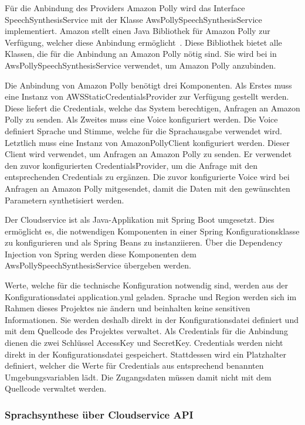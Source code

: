 Für die Anbindung des Providers Amazon Polly wird das Interface SpeechSynthesisService mit der Klasse AwsPollySpeechSynthesisService implementiert.
Amazon stellt einen Java Bibliothek für Amazon Polly zur Verfügung, welcher diese Anbindung ermöglicht~\cite{aws_polly_sdks}.
Diese Bibliothek bietet alle Klassen, die für die Anbindung an Amazon Polly nötig sind.
Sie wird bei in AwsPollySpeechSynthesisService verwendet, um Amazon Polly anzubinden.

Die Anbindung von Amazon Polly benötigt drei Komponenten.
Als Erstes muss eine Instanz von AWSStaticCredentialsProvider zur Verfügung gestellt werden.
Diese liefert die Credentials, welche das System berechtigen, Anfragen an Amazon Polly zu senden.
Als Zweites muss eine Voice konfiguriert werden.
Die Voice definiert Sprache und Stimme, welche für die Sprachausgabe verwendet wird.
Letztlich muss eine Instanz von AmazonPollyClient konfiguriert werden.
Dieser Client wird verwendet, um Anfragen an Amazon Polly zu senden.
Er verwendet den zuvor konfigurierten CredentialsProvider, um die Anfrage mit den entsprechenden Credentials zu ergänzen.
Die zuvor konfigurierte Voice wird bei Anfragen an Amazon Polly mitgesendet, damit die Daten mit den gewünschten Parametern synthetisiert werden.

Der Cloudservice ist als Java-Applikation mit Spring Boot umgesetzt.
Dies ermöglicht es, die notwendigen Komponenten in einer Spring Konfigurationsklasse zu konfigurieren und als Spring Beans zu instanziieren.
Über die Dependency Injection von Spring werden diese Komponenten dem AwsPollySpeechSynthesisService übergeben werden.

Werte, welche für die technische Konfiguration notwendig sind, werden aus der Konfigurationsdatei application.yml geladen.
Sprache und Region werden sich im Rahmen dieses Projektes nie ändern und beinhalten keine sensitiven Informationen.
Sie werden deshalb direkt in der Konfigurationsdatei definiert und mit dem Quellcode des Projektes verwaltet.
Als Credentials für die Anbindung dienen die zwei Schlüssel AccessKey und SecretKey.
Credentials werden nicht direkt in der Konfigurationsdatei gespeichert.
Stattdessen wird ein Platzhalter definiert, welcher die Werte für Credentials aus entsprechend benannten Umgebungsvariablen lädt.
Die Zugangsdaten müssen damit nicht mit dem Quellcode verwaltet werden.

\subsubsection{Sprachsynthese über Cloudservice API}

